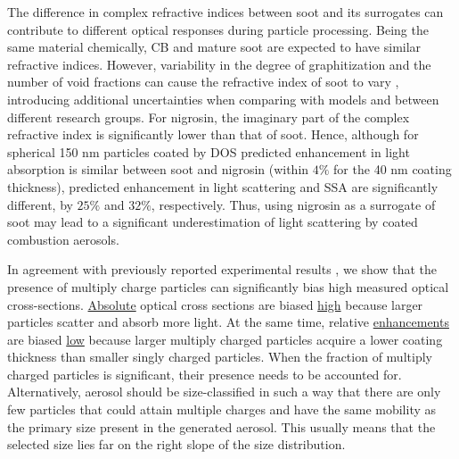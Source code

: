 The difference in complex refractive indices between soot and its surrogates can contribute to different optical responses during particle processing. Being the same material chemically, CB and mature soot are expected to have similar refractive indices. However, variability in the degree of graphitization and the number of void fractions can cause the refractive index of soot to vary \citep{RN72}, introducing additional uncertainties when comparing with models and between different research groups. For nigrosin, the imaginary part of the complex refractive index is significantly lower than that of soot. Hence, although for spherical 150 nm particles coated by DOS predicted enhancement in light absorption is similar between soot and nigrosin (within $4\%$ for the 40 nm coating thickness), predicted enhancement in light scattering and SSA are significantly different, by $25\%$ and $32\%$, respectively. Thus, using nigrosin as a surrogate of soot may lead to a significant underestimation of light scattering by coated combustion aerosols. 

In agreement with previously reported experimental results \citep{RN7,RN67}, we show that the presence of multiply charge particles can significantly bias high measured optical cross-sections. \underline{Absolute} optical cross sections are biased \underline{high} because larger particles scatter and absorb more light. At the same time, relative \underline{enhancements} are biased \underline{low} because larger multiply charged particles acquire a lower coating thickness than smaller singly charged particles. When the fraction of multiply charged particles is significant, their presence needs to be accounted for. Alternatively, aerosol should be size-classified in such a way that there are only few particles that could attain multiple charges and have the same mobility as the primary size present in the generated aerosol. This usually means that the selected size lies far on the right slope of the size distribution.


